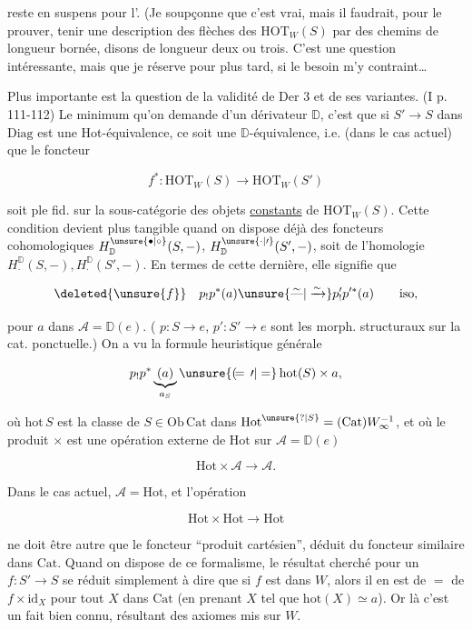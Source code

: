 reste en suspens pour l'. (Je soupçonne que c'est vrai, mais il faudrait, pour le prouver, tenir une description des flèches des $\mathrm{HOT}_W(S)$ par des chemins de longueur bornée, disons  de longueur deux ou trois. C'est une question intéressante, mais que je réserve pour plus tard, si le besoin m'y contraint\ldots

Plus importante est la question de la validité de Der 3 et de ses variantes. (I p. 111-112) Le minimum qu'on demande d'un dérivateur $\mathbb D$, c'est que si $S'\longrightarrow S$ dans $\mathrm{Diag}$ est une Hot-équivalence, ce soit une $\mathbb D$-équivalence, i.e.  (dans le cas actuel) que le foncteur

\[
f^*:\mathrm{HOT}_W(S)\longrightarrow\mathrm{HOT}_W(S')
\]

soit ple fid. sur la sous-catégorie des objets \uline{constants} de $\mathrm{HOT}_W(S)$. Cette condition devient plus tangible quand on dispose déjà  des foncteurs cohomologiques $H^{\unsure{\bullet|\circ}}_{\mathbb D}(S,-)$, $H^{\unsure{\cdot|\prime}}_{\mathbb D}(S',-)$, soit de l'homologie $H^{\mathbb D}_{\cdot}(S,-),H^{\mathbb D}_{\cdot}(S',-)$. En termes de cette dernière, elle signifie que

\[
\deleted{\unsure{f}}\quad p_!p^*(a)\unsure{\overset{\sim}{\text{---}}|\xrightarrow{\sim}}p'_!p'^*(a)\qquad\text{iso},
\]

pour  $a$ dans $\mathcal A=\mathbb D(e)$. ( $p:S\longrightarrow e$, $p':S'\longrightarrow e$ sont les morph. structuraux sur la cat. ponctuelle.) On a vu la formule heuristique générale

\[
p_!p^*\underbrace{(a)}_{a_S}\unsure{(\!=\,\prime|=}\,\mathrm{hot}(S)\times a,
\]

où $\mathrm{hot}\,S$ est la classe de $S\in\mathrm{Ob}\,\mathrm{Cat}$ dans $\mathrm{Hot}^{\unsure{?|S}}=(\mathrm{Cat})W_\infty^{-1}$, et où le produit $\times$ est une opération externe de $\mathrm{Hot}$ sur $\mathcal A=\mathbb D(e)$

\[
\mathrm{Hot}\times\mathcal A\longrightarrow\mathcal A.
\]

Dans le cas actuel, $\mathcal A=\mathrm{Hot}$, et l'opération

\[
\mathrm{Hot}\times\mathrm{Hot}\longrightarrow\mathrm{Hot}
\]

ne doit être autre que le  foncteur ``produit cartésien'',  déduit du foncteur similaire dans $\mathrm{Cat}$. Quand on dispose de ce formalisme, le résultat cherché pour un $f:S'\longrightarrow S$ se réduit simplement à dire que si $f$ est dans $W$, alors il en est de $=$ de $f\times\mathrm{id}_X$ pour tout $X$ dans $\mathrm{Cat}$ (en prenant $X$ tel que $\mathrm{hot}(X)\simeq a$). Or là c'est un fait bien connu, résultant des axiomes mis sur $W$.

